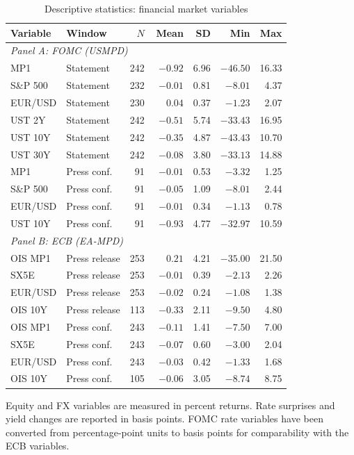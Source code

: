 \begin{table}[htbp]
\centering
\caption{Descriptive statistics: financial market variables}
\label{tab:market_desc}
\begin{threeparttable}
\small
\begin{tabular}{llrrrrr}
\toprule
Variable & Window & $N$ & Mean & SD & Min & Max \\
\midrule
\multicolumn{7}{l}{\textit{Panel A: FOMC (USMPD)}} \\
MP1       & Statement  & 242 & $-0.92$ & 6.96 & $-46.50$ & 16.33 \\
S\&P 500  & Statement  & 232 & $-0.01$ & 0.81 & $-8.01$ & 4.37 \\
EUR/USD   & Statement  & 230 & $\phantom{-}0.04$ & 0.37 & $-1.23$ & 2.07 \\
UST 2Y    & Statement  & 242 & $-0.51$ & 5.74 & $-33.43$ & 16.95 \\
UST 10Y   & Statement  & 242 & $-0.35$ & 4.87 & $-43.43$ & 10.70 \\
UST 30Y   & Statement  & 242 & $-0.08$ & 3.80 & $-33.13$ & 14.88 \\
\addlinespace
MP1       & Press conf. & 91  & $-0.01$ & 0.53 & $-3.32$ & 1.25 \\
S\&P 500  & Press conf. & 91  & $-0.05$ & 1.09 & $-8.01$ & 2.44 \\
EUR/USD   & Press conf. & 91  & $-0.01$ & 0.34 & $-1.13$ & 0.78 \\
UST 10Y   & Press conf. & 91  & $-0.93$ & 4.77 & $-32.97$ & 10.59 \\
\midrule
\multicolumn{7}{l}{\textit{Panel B: ECB (EA-MPD)}} \\
OIS MP1   & Press release & 253 & $\phantom{-}0.21$ & 4.21 & $-35.00$ & 21.50 \\
SX5E      & Press release & 253 & $-0.01$ & 0.39 & $-2.13$ & 2.26 \\
EUR/USD   & Press release & 253 & $-0.02$ & 0.24 & $-1.08$ & 1.38 \\
OIS 10Y   & Press release & 113 & $-0.33$ & 2.11 & $-9.50$ & 4.80 \\
\addlinespace
OIS MP1   & Press conf. & 243 & $-0.11$ & 1.41 & $-7.50$ & 7.00 \\
SX5E      & Press conf. & 243 & $-0.07$ & 0.60 & $-3.00$ & 2.04 \\
EUR/USD   & Press conf. & 243 & $-0.03$ & 0.42 & $-1.33$ & 1.68 \\
OIS 10Y   & Press conf. & 105 & $-0.06$ & 3.05 & $-8.74$ & 8.75 \\
\bottomrule
\end{tabular}
\begin{tablenotes}\footnotesize
  \item[] Equity and FX variables are measured in percent returns. Rate surprises and
  yield changes are reported in basis points. FOMC rate variables have been converted
  from percentage-point units to basis points for comparability with the ECB variables.
\end{tablenotes}
\end{threeparttable}
\end{table}


